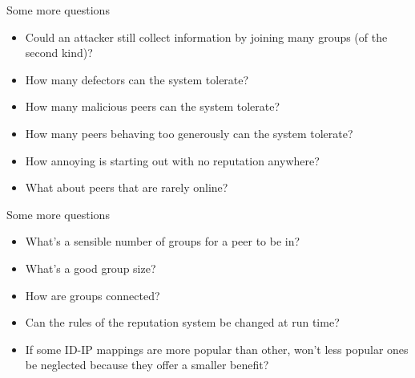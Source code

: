 \documentclass[presentation,english,usenames,dvipsnames]{beamer}
\begin{document}
\begin{frame}{Some more questions}
  \begin{itemize}
    \item Could an attacker still collect information by joining many groups (of
          the second kind)?
    \item How many defectors can the system tolerate?
    \item How many malicious peers can the system tolerate?
    \item How many peers behaving too generously can the system tolerate?
    \item How annoying is starting out with no reputation anywhere?
    \item What about peers that are rarely online?
  \end{itemize}
\end{frame}

\begin{frame}{Some more questions}
  \begin{itemize}
    \item What's a sensible number of groups for a peer to be in?
    \item What's a good group size?
    \item How are groups connected?
    \item Can the rules of the reputation system be changed at run time?
    \item If some ID-IP mappings are more popular than other, won't less popular
          ones be neglected because they offer a smaller benefit?
  \end{itemize}
\end{frame}
\end{document}
